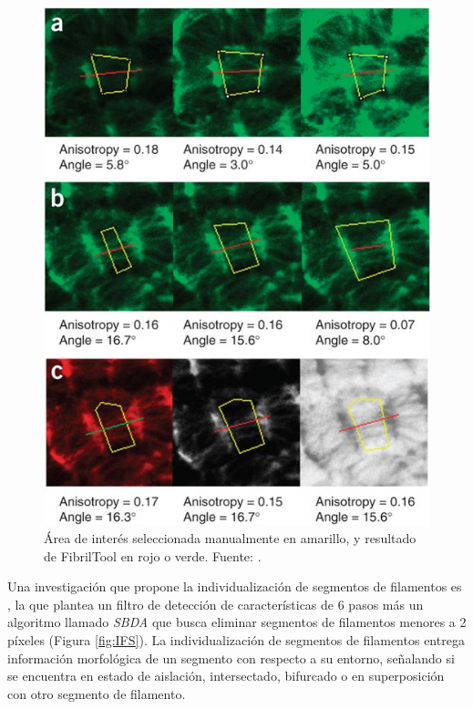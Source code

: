 \begin{figure}[h!]
        \centering
        \includegraphics[scale=0.6]{imagenes/fibritool.jpg}
        \caption[\'Area de inter\'es seleccionada manualmente en amarillo, y resultado de FibrilTool en rojo o verde.]{\'Area de inter\'es seleccionada manualmente en amarillo, y resultado de FibrilTool en rojo o verde. Fuente: \citet{boudaoud2014fibriltool}.}
        \label{fig:fibritool}
\end{figure}

Una investigaci\'on que propone la individualizaci\'on de segmentos de filamentos es \citet{qiu2014quantitative}, la que plantea un filtro de detecci\'on de caracter\'isticas de 6 pasos m\'as un algoritmo llamado \textit{SBDA} que busca eliminar segmentos de filamentos menores a 2 p\'ixeles (Figura \ref{fig:IFS}). La individualizaci\'on de segmentos de filamentos entrega informaci\'on morfol\'ogica de un segmento con respecto a su entorno, se\~nalando si se encuentra en estado de aislaci\'on, intersectado, bifurcado o en superposici\'on con otro segmento de filamento.

